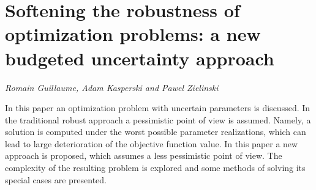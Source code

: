 \documentclass[../booklet.tex]{subfiles}
\begin{document}
\section[Softening the robustness of optimization problems: a new budgeted uncertainty approach. {\it Romain Guillaume, Adam Kasperski and Pawel Zielinski}]{Softening the robustness of optimization problems: a new budgeted uncertainty approach}
  

\begin{center}
  {\it Romain Guillaume, Adam Kasperski and Pawel Zielinski}
\end{center}

\vskip 0.8cm


In this paper an optimization problem with uncertain parameters is discussed. In the traditional robust approach a pessimistic point of view is assumed. Namely, a solution is computed under the worst possible parameter realizations, which can lead to large deterioration of the objective  function value. In this paper a new approach is proposed, which assumes a less pessimistic point of view.  The complexity of the resulting problem is explored and some methods of solving its special cases are presented.
\end{document}
